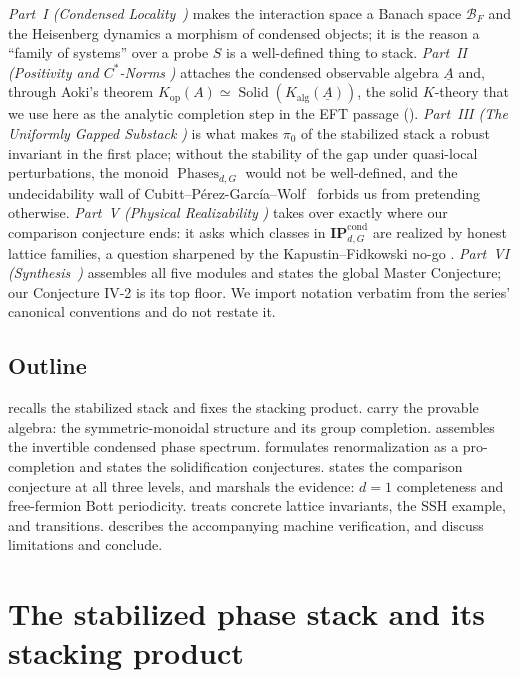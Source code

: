 \documentclass[12pt]{article}
\newcommand{\cond}[1]{\underline{#1}}          %
\newcommand{\BF}{\mathcal{B}_{F}}              %
\newcommand{\Phases}{\operatorname{Phases}}    %
\newcommand{\IPcond}{\mathbf{IP}^{\mathrm{cond}}}  %
\newcommand{\Kop}{K_{\mathrm{op}}}             %
\newcommand{\Kalg}{K_{\mathrm{alg}}}           %
\newcommand{\Solid}{\operatorname{Solid}}      %
\theoremstyle{definition}
\theoremstyle{remark}
\theoremstyle{plain}
\begin{document}
\emph{Part~I (Condensed Locality}~\cite{paperLocality}\emph{)} makes the
interaction space a Banach space $\BF$ and the Heisenberg dynamics a morphism of
condensed objects; it is the reason a ``family of systems'' over a probe $S$ is a
well-defined thing to stack. \emph{Part~II (Positivity and $C^*$-Norms}
\cite{paperPositivity}\emph{)} attaches the condensed observable algebra
$\cond{A}$ and, through Aoki's theorem $\Kop(A)\simeq\Solid(\Kalg(\cond{A}))$,
the solid $K$-theory that we use here as the analytic completion step in the EFT
passage (). \emph{Part~III (The Uniformly Gapped Substack}
\cite{paperGap}\emph{)} is what makes $\pi_0$ of the stabilized stack a robust
invariant in the first place; without the stability of the gap under quasi-local
perturbations, the monoid $\Phases_{d,G}$ would not be well-defined, and the
undecidability wall of Cubitt--P\'erez-Garc\'ia--Wolf~\cite{cpw-undecidable}
forbids us from pretending otherwise. \emph{Part~V (Physical Realizability}
\cite{paperRealizability}\emph{)} takes over exactly where our comparison
conjecture ends: it asks which classes in $\IPcond_{d,G}$ are realized by honest
lattice families, a question sharpened by the Kapustin--Fidkowski no-go
\cite{kapustin-fidkowski}. \emph{Part~VI (Synthesis}~\cite{paperSynthesis}\emph{)}
assembles all five modules and states the global Master Conjecture; our
Conjecture IV-2 is its top floor. We import notation verbatim from the series'
canonical conventions and do not restate it.

\subsection{Outline}
 recalls the stabilized stack and fixes the stacking
product.  carry the provable algebra:
the symmetric-monoidal structure and its group completion.
 assembles the invertible condensed phase spectrum.
 formulates renormalization as a pro-completion and states the
solidification conjectures.  states the comparison
conjecture at all three levels, and  marshals the evidence:
$d=1$ completeness and free-fermion Bott periodicity. 
treats concrete lattice invariants, the SSH example, and transitions.
 describes the accompanying machine verification, and
 discuss limitations and conclude.

\section{The stabilized phase stack and its stacking product}
\label{sec:recollections}
\end{document}
